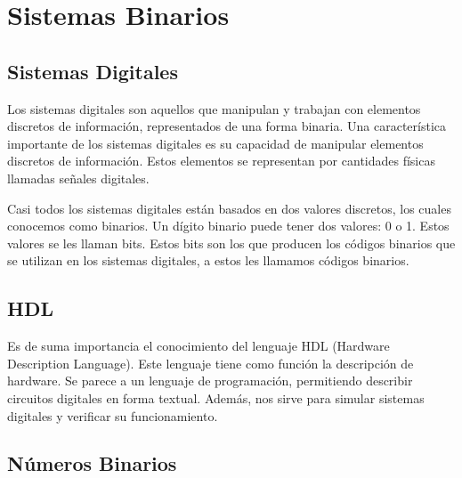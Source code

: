 \section{Sistemas Binarios}

\subsection{Sistemas Digitales}

Los sistemas digitales son aquellos que manipulan y trabajan con elementos discretos de información, 
representados de una forma binaria. Una característica importante de los sistemas digitales es su 
capacidad de manipular elementos discretos de información. Estos elementos se representan por 
cantidades físicas llamadas señales digitales. 

Casi todos los sistemas digitales están basados en dos valores discretos, los cuales conocemos como binarios. 
Un dígito binario puede tener dos valores: 0 o 1. Estos valores se les llaman bits. Estos bits son los que producen 
los códigos binarios que se utilizan en los sistemas digitales, a estos les llamamos códigos binarios.

\subsection*{HDL}

Es de suma importancia el conocimiento del lenguaje HDL (Hardware Description Language). Este lenguaje 
tiene como función la descripción de hardware. Se parece a un lenguaje de programación, 
permitiendo describir circuitos digitales en forma textual. Además, nos sirve para simular sistemas digitales 
y verificar su funcionamiento.

\begin{center}
\end{center}

\subsection{Números Binarios}

